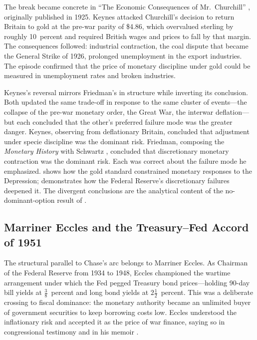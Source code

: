 \documentclass[12pt]{article}
\begin{document}
The break became concrete in ``The Economic Consequences of
Mr.~Churchill'' \citep{Keynes1931}, originally published in 1925.
Keynes attacked Churchill's decision to return Britain to gold at the
pre-war parity of \$4.86, which overvalued sterling by roughly
10~percent and required British wages and prices to fall by that margin.
The consequences followed: industrial contraction, the coal dispute that
became the General Strike of 1926, prolonged unemployment in the export
industries.  The episode confirmed that the price of monetary discipline
under gold could be measured in unemployment rates and broken industries.

Keynes's reversal mirrors Friedman's in structure while inverting its
conclusion.  Both updated the same trade-off in response to the same
cluster of events---the collapse of the pre-war monetary order, the
Great War, the interwar deflation---but each concluded that the other's
preferred failure mode was the greater danger.  Keynes, observing from
deflationary Britain, concluded that adjustment under specie discipline
was the dominant risk.  Friedman, composing the \textit{Monetary
History} with Schwartz \citep{FriedmanSchwartz1963}, concluded that
discretionary monetary contraction was the dominant risk.  Each was
correct about the failure mode he emphasized.
\citet{Eichengreen1992} shows how the gold standard constrained
monetary responses to the Depression; \citet{FriedmanSchwartz1963}
demonstrates how the Federal Reserve's discretionary failures deepened
it.  The divergent conclusions are the analytical content of the
no-dominant-option result of \citet{Sargent2011}.

\subsection{Marriner Eccles and the Treasury--Fed Accord of 1951}

The structural parallel to Chase's arc belongs to Marriner Eccles.
As Chairman of the Federal Reserve from 1934 to 1948, Eccles championed
the wartime arrangement under which the Fed pegged Treasury bond
prices---holding 90-day bill yields at $\tfrac{3}{8}$~percent and long
bond yields at $2\tfrac{1}{2}$~percent.  This was a deliberate crossing
to fiscal dominance: the monetary authority became an unlimited buyer of
government securities to keep borrowing costs low.  Eccles understood the
inflationary risk and accepted it as the price of war finance, saying so
in congressional testimony and in his memoir \citep{Eccles1951}.
\end{document}
